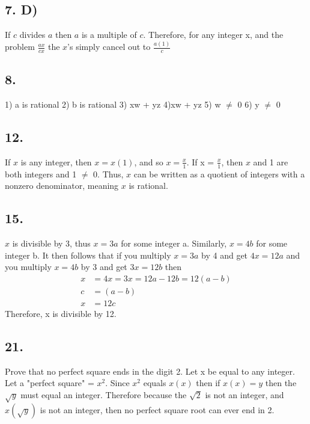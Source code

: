 \documentclass[12]{scrartcl}
\begin{document}
\subsection*{7. D)}
If $c$ divides $a$ then $a$ is a multiple of $c$. Therefore, for any integer x, and the problem  $\frac{ax}{cx}$ the $x$'s simply cancel out to $\frac{a(1)}{c}$
\subsection*{8.}
1) a is rational
2) b is rational
3) xw + yz
4)xw + yz
5) w $\neq$ 0
6) y $\neq$ 0
\subsection*{12.}
If $x$ is any integer, then $x = x(1)$, and so $x = \frac{x}{1}$. If x = $\frac{x}{1}$, then $x$ and 1 are both integers and 1 $\neq$ 0. Thus, $x$ can be written as a quotient of integers with a nonzero denominator, meaning $x$ is rational. 
\subsection*{15.}
$x$ is divisible by 3, thus $x = 3a$ for some integer a. Similarly, $x = 4b$ for some integer b. It then follows that if you multiply $x = 3a$ by 4 and get $4x = 12a$ and you multiply $x = 4b$ by 3 and get $3x = 12b$ then 
\begin{align*} 
x &= 4x = 3x = 12a - 12b = 12(a-b) 
\\  c &= (a-b)
\\x &= 12c
\end{align*}
Therefore, x is divisible by 12.
\subsection*{21.}
Prove that no perfect square ends in the digit 2. Let x be equal to any integer. Let  a "perfect square" = $x^2$. Since $x^2$ equals $x(x)$ then if $x(x) = y$ then the $\sqrt{y}$ must equal an integer. Therefore because the $\sqrt{2}$ is not an integer, and $x(\sqrt{y})$ is not an integer, then no perfect square root can ever end in 2. 
\end{document}
